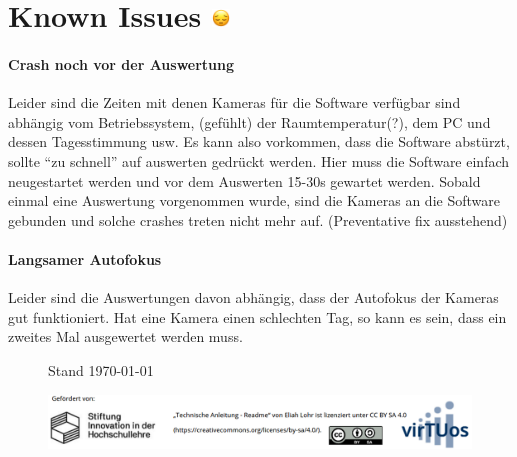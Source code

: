 \documentclass[a4paper, 10pt]{article}
\begin{document}
\section{Known Issues \includegraphics[height=0.65em]{emojis/pensive.png}}
\label{sec:known-issues}
\paragraph{Crash noch vor der Auswertung} Leider sind die Zeiten mit denen  Kameras für die Software verfügbar sind abhängig vom Betriebssystem, (gefühlt) der Raumtemperatur(?), dem PC und dessen Tagesstimmung usw. Es kann also vorkommen, dass die Software abstürzt, sollte \enquote{zu schnell} auf auswerten gedrückt werden. Hier muss die Software einfach neugestartet werden und vor dem Auswerten 15-30s gewartet werden. Sobald einmal eine Auswertung vorgenommen wurde, sind die Kameras an die Software gebunden und solche crashes treten nicht mehr auf. {\scriptsize(Preventative fix ausstehend)}

\paragraph{Langsamer Autofokus}
Leider sind die Auswertungen davon abhängig, dass der Autofokus der Kameras gut funktioniert. Hat eine Kamera einen schlechten Tag, so kann es sein, dass ein zweites Mal ausgewertet werden muss.



\begin{figure}[b]
    \begin{flushleft}
        \hspace*{7.4mm}
        {\footnotesize Stand \today}
    \end{flushleft}
    \vspace{-3.5mm}
    \centering
    \includegraphics[width=14.61cm]{funding+license.png}
\end{figure}
\end{document}
